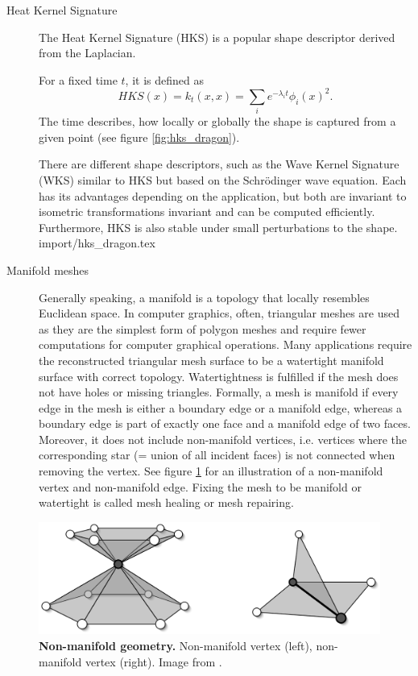 \documentclass[class=article, crop=false]{standalone}
\begin{document}
\begin{description}
    \item[Heat Kernel Signature] The Heat Kernel Signature (HKS) is a popular shape descriptor derived from the Laplacian. 
    
    For a fixed time $t$, it is defined as 
    \begin{equation}
        HKS(x) = k_t(x,x) = \sum_{i} e^{-\lambda_i t}\phi_i(x)^2.
    \end{equation}
    The time describes, how locally or globally the shape is captured from a given point (see figure \ref{fig:hks_dragon}).
    
    There are different shape descriptors, such as the Wave Kernel Signature (WKS) similar to HKS but based on the Schrödinger wave equation. Each has its advantages depending on the application, but both are invariant to isometric transformations invariant and can be computed efficiently.
    Furthermore, HKS is also stable under small perturbations to the shape.
    {import/hks_dragon.tex}
    
    \item[Manifold meshes] Generally speaking, a manifold is a topology that locally resembles Euclidean space. In computer graphics, often, triangular meshes are used as they are the simplest form of polygon meshes and require fewer computations for computer graphical operations. Many applications require the reconstructed triangular mesh surface to be a watertight manifold surface with correct topology. Watertightness is fulfilled if the mesh does not have holes or missing triangles. Formally, a mesh is manifold if every edge in the mesh is either a boundary edge or a manifold edge, whereas a boundary edge is part of exactly one face and a manifold edge of two faces. Moreover, it does not include non-manifold vertices, i.e. vertices where the corresponding star (= union of all incident faces) is not connected when removing the vertex. See figure \ref{fig:non-manif-e-v} for an illustration of a non-manifold vertex and non-manifold edge.
    Fixing the mesh to be manifold or watertight is called mesh healing or mesh repairing.
    \end{description}
    
    
\vspace{0.05\linewidth}

\begin{figure}[h]
    \centering
    \includegraphics[width=0.4\linewidth]{thesis/appendices/import/imgs/non-manif-e-v.png}
    \caption{\textbf{Non-manifold geometry.}
\small Non-manifold vertex (left), non-manifold vertex (right). Image from \cite{Botsch2010}.
}
    \label{fig:non-manif-e-v}
\end{figure}
\vspace{0.05\linewidth}
    
\end{document}
